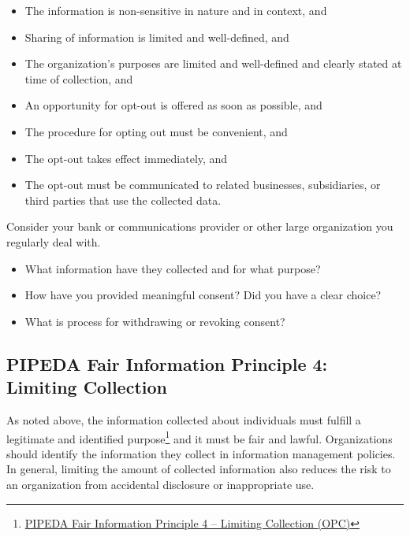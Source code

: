 \begin{itemize}
   \item The information is non-sensitive in nature and in context, and
   \item Sharing of information is limited and well-defined, and
   \item The organization's purposes are limited and well-defined and clearly stated at time of collection, and
   \item An opportunity for opt-out is offered as soon as possible, and
   \item The procedure for opting out must be convenient, and
   \item The opt-out takes effect immediately, and
   \item The opt-out must be communicated to related businesses, subsidiaries, or third parties that use the collected data.
\end{itemize}

\begin{exercisebox}

Consider your bank or communications provider or other large organization you regularly deal with. 
\begin{itemize}
  \item What information have they collected and for what purpose?
  \item How have you provided meaningful consent? Did you have a clear choice?
  \item What is process for withdrawing or revoking consent?
\end{itemize}
\end{exercisebox}

\subsection*{PIPEDA Fair Information Principle 4: Limiting Collection}

As noted above, the information collected about individuals must fulfill a legitimate and identified purpose\footnote{\href{https://www.priv.gc.ca/en/privacy-topics/privacy-laws-in-canada/the-personal-information-protection-and-electronic-documents-act-pipeda/p_principle/principles/p_collection/}{PIPEDA Fair Information Principle 4 -- Limiting Collection (OPC)}} and it must be fair and lawful. Organizations should identify the information they collect in information management policies. In general, limiting the amount of collected information also reduces the risk to an organization from accidental disclosure or inappropriate use. 

